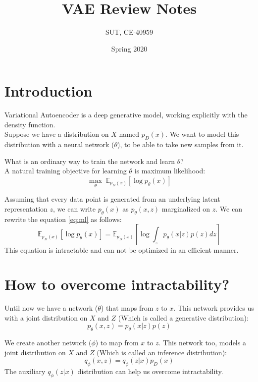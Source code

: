 \documentclass{article}
\title{VAE Review Notes}
\author{SUT, CE-40959}
\date{Spring 2020}
\begin{document}
\maketitle

\section{Introduction}
Variational Autoencoder is a deep generative model, working explicitly with the density function. \\
Suppose we have a distribution on $X$ named $p_D(x)$. We want to model this distribution with a neural network ($\theta$), to be able to take new samples from it.

What is an ordinary way to train the network and learn $\theta$? \\
A natural training objective for learning $\theta$ is maximum likelihood:
\begin{equation}
    \label{eq:ml}
    \underset{\theta}{\max} \; \mathbb{E}_{p_D(x)}[\log p_\theta(x)]
\end{equation}

Assuming that every data point is generated from an underlying latent representation $z$, we can write $p_\theta(x)$ as $p_\theta(x, z)$ marginalized on $z$. We can rewrite the equation \ref{eq:ml} as follows:
\begin{equation}
    \label{eq:intractable}
    \mathbb{E}_{p_D(x)}[\log p_\theta(x)] = \mathbb{E}_{p_D(x)}[\log \int_z p_\theta(x|z) p(z) dz]
\end{equation}
This equation is intractable and can not be optimized in an efficient manner.

\section{How to overcome intractability?}
Until now we have a network ($\theta$) that maps from $z$ to $x$. This network provides us with a joint distribution on $X$ and $Z$ (Which is called a generative distribution):
\begin{equation}
    p_\theta(x, z) = p_\theta(x|z) p(z)
\end{equation}

We create another network ($\phi$) to map from $x$ to $z$. This network too, models a joint distribution on $X$ and $Z$ (Which is called an inference distribution):
\begin{equation}
    q_\phi(x, z) = q_\phi(z|x) p_D(x)
\end{equation}
The auxiliary $q_\phi(z|x)$ distribution can help us overcome intractability.
\end{document}
